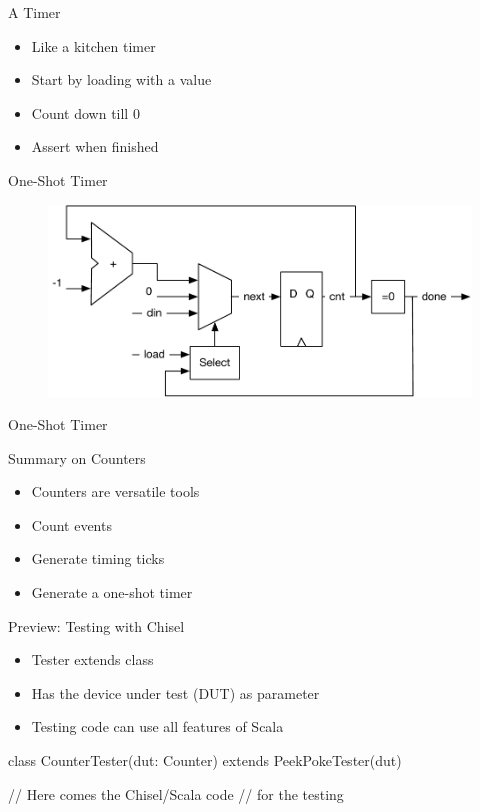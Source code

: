 \begin{frame}[fragile]{A Timer}
\begin{itemize}
\item Like a kitchen timer
\item Start by loading with a value
\item Count down till 0
\item Assert  when finished
\end{itemize}
\end{frame}

\begin{frame}[fragile]{One-Shot Timer}
\begin{figure}
  \includegraphics[scale=\scale]{../figures/timer}
\end{figure}
\end{frame}

\begin{frame}[fragile]{One-Shot Timer}
\end{frame}

\begin{frame}[fragile]{Summary on Counters}
\begin{itemize}
\item Counters are versatile tools
\item Count events
\item Generate timing ticks
\item Generate a one-shot timer
\end{itemize}
\end{frame}


\begin{frame}[fragile]{Preview: Testing with Chisel}
\begin{itemize}
\item Tester extends class 
\item Has the device under test (DUT) as parameter
\item Testing code can use all features of Scala
\end{itemize}
\begin{chisel}
class CounterTester(dut: Counter) extends PeekPokeTester(dut) {

  // Here comes the Chisel/Scala code
  // for the testing
}
\end{chisel}
\end{frame}


